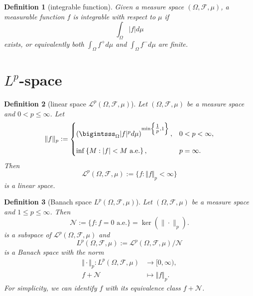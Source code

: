 \documentclass{report}
\newtheorem{definition}{Definition}[section]
\theoremstyle{nonumberplain}
\begin{document}
\begin{definition}[integrable function]
	Given a measure space $(\Omega, \mathcal{F},\mu)$, a measurable function $f$ is integrable with respect to $\mu$ if
	\[
	\int_\Omega |f| d \mu
	\]
	exists, or equivalently both $\int_\Omega f^+ d \mu$ and $\int_\Omega f^- d \mu$ are finite.
\end{definition}

\section{$L^p$-space}

\begin{definition}[linear space $\mathcal{L}^p(\Omega, \mathcal{F}, \mu)$] Let $(\Omega, \mathcal{F}, \mu)$ be a measure space and $0< p \leq\infty$. Let
\[
	\Vert f\Vert_p:=
	\begin{cases}
		\left(\bigintsss_\Omega |f|^pd\mu\right)^{\min\left\{\tfrac{1}{p},1\right\}},&0< p< \infty,\\[10pt]
		\inf \left\{M: |f|<M\text{ a.e.}\right\},&p=\infty.
	\end{cases}
\]
Then 
\[
\mathcal{L}^{p}(\Omega, \mathcal{F}, \mu):=\{f:\Vert f\Vert_p<\infty\}
\]
is a linear space.

\end{definition}


\begin{definition}[Banach space $L^p(\Omega, \mathcal{F}, \mu)$] Let $(\Omega, \mathcal{F}, \mu)$ be a measure space and $1\le p \leq\infty$. Then
	\[
	\mathcal{N}:=\{f: f=0\text{ a.e.}\}=\operatorname{ker}\left(\|\cdot\|_{p}\right).
	\]
	is a subspace of $\mathcal{L}^{p}(\Omega, \mathcal{F}, \mu)$ and
	\[
	L^{p}(\Omega, \mathcal{F}, \mu):=\mathcal{L}^{p}(\Omega, \mathcal{F}, \mu)/\mathcal{N}
	\]
	is a Banach space with the norm
	\begin{align*}
	\Vert \cdot\Vert_p:L^{p}(\Omega, \mathcal{F}, \mu)&\longrightarrow [0,\infty),\\
	f+\mathcal{N} &\longmapsto \Vert f\Vert_p.
	\end{align*}
    For simplicity, we can identify $f$ with its equivalence class $f+\mathcal{N}$.
\end{definition}
\end{document}
